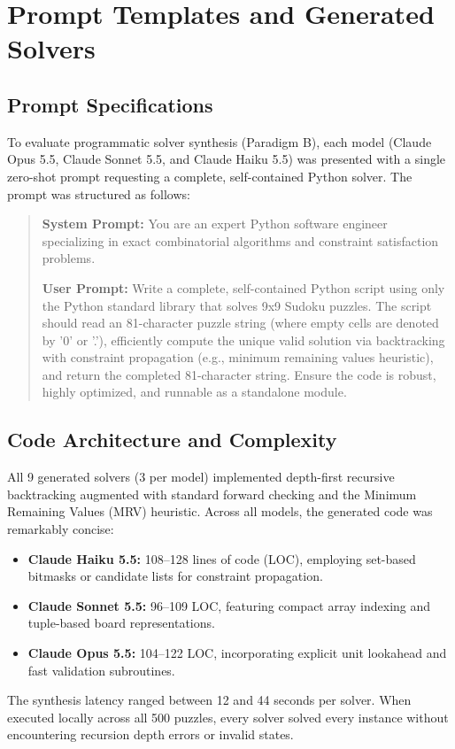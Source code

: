 \documentclass{article} %
\begin{document}



\clearpage
\appendix
\section{Prompt Templates and Generated Solvers}
\label{sec:appendix}
\label{sec:appendix_prompts}

\subsection{Prompt Specifications}
To evaluate programmatic solver synthesis (Paradigm B), each model (Claude Opus 5.5, Claude Sonnet 5.5, and Claude Haiku 5.5) was presented with a single zero-shot prompt requesting a complete, self-contained Python solver. The prompt was structured as follows:

\begin{quote}
\small
\textbf{System Prompt:} You are an expert Python software engineer specializing in exact combinatorial algorithms and constraint satisfaction problems.

\textbf{User Prompt:} Write a complete, self-contained Python script using only the Python standard library that solves 9x9 Sudoku puzzles. The script should read an 81-character puzzle string (where empty cells are denoted by '0' or '.'), efficiently compute the unique valid solution via backtracking with constraint propagation (e.g., minimum remaining values heuristic), and return the completed 81-character string. Ensure the code is robust, highly optimized, and runnable as a standalone module.
\end{quote}

\subsection{Code Architecture and Complexity}
All 9 generated solvers (3 per model) implemented depth-first recursive backtracking augmented with standard forward checking and the Minimum Remaining Values (MRV) heuristic. Across all models, the generated code was remarkably concise:
\begin{itemize}
    \item \textbf{Claude Haiku 5.5:} 108--128 lines of code (LOC), employing set-based bitmasks or candidate lists for constraint propagation.
    \item \textbf{Claude Sonnet 5.5:} 96--109 LOC, featuring compact array indexing and tuple-based board representations.
    \item \textbf{Claude Opus 5.5:} 104--122 LOC, incorporating explicit unit lookahead and fast validation subroutines.
\end{itemize}
The synthesis latency ranged between 12 and 44 seconds per solver. When executed locally across all 500 puzzles, every solver solved every instance without encountering recursion depth errors or invalid states.
\end{document}
